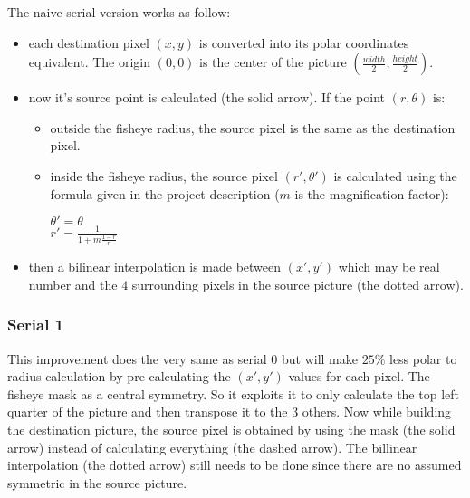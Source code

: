 \documentclass[10pt,a4paper]{article}
\begin{document}
The naive serial version works as follow:

\begin{itemize}
    \item each destination pixel $(x,y)$ is converted into its polar
    coordinates equivalent. The origin $(0,0)$ is the center of the picture
    $(\frac{width}{2},\frac{height}{2})$.
    
    \item now it’s source point is calculated (the solid arrow). If the point
    $(r,\theta)$ is:

    \begin{itemize}
        \item outside the fisheye radius, the source pixel is the same as the
        destination pixel.


        \item inside the fisheye radius, the source pixel
        $(r\prime,\theta\prime)$ is calculated using the formula given in
        the project description ($m$ is the magnification factor):
        
        $ \theta\prime = \theta $ \\
        $ r' = \frac{1}{1+m\frac{1-r}{r}} $
        
    \end{itemize}

    \item then a bilinear interpolation is made between $(x\prime,y\prime)$
    which may be real number and the $4$ surrounding pixels in the source
    picture (the dotted arrow).

\end{itemize}

\subsubsection{Serial 1}

This improvement does the very same as serial 0 but will make $25\%$ less polar
to radius calculation by pre-calculating the $(x\prime,y\prime)$ values for
each pixel. The fisheye mask as a central symmetry. So it exploits it to only
calculate the top left quarter of the picture and then transpose it to the $3$
others. Now while building the destination picture, the source pixel is
obtained by using the mask (the solid arrow) instead of calculating everything
(the dashed arrow).  The billinear interpolation (the dotted arrow) still needs
to be done since there are no assumed symmetric in the source picture.
\end{document}
